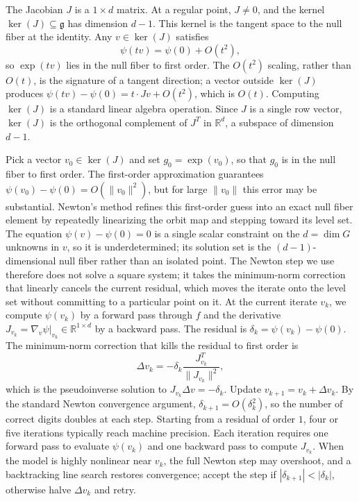 \documentclass[11pt]{article}
\newcommand{\RR}{\mathbb{R}}
\begin{document}
The Jacobian $J$ is a $1 \times d$ matrix. At a regular point, $J \neq 0$, and the kernel $\ker(J) \subseteq \mathfrak{g}$ has dimension $d - 1$. This kernel is the tangent space to the null fiber at the identity. Any $v \in \ker(J)$ satisfies
\begin{equation}
    \psi(tv) = \psi(0) + O(t^2),
\end{equation}
so $\exp(tv)$ lies in the null fiber to first order. The $O(t^2)$ scaling, rather than $O(t)$, is the signature of a tangent direction; a vector outside $\ker(J)$ produces $\psi(tv) - \psi(0) = t \cdot Jv + O(t^2)$, which is $O(t)$. Computing $\ker(J)$ is a standard linear algebra operation. Since $J$ is a single row vector, $\ker(J)$ is the orthogonal complement of $J^T$ in $\RR^d$, a subspace of dimension $d - 1$.

Pick a vector $v_0 \in \ker(J)$ and set $g_0 = \exp(v_0)$, so that $g_0$ is in the null fiber to first order. The first-order approximation guarantees $\psi(v_0) - \psi(0) = O(\|v_0\|^2)$, but for large $\|v_0\|$ this error may be substantial. Newton's method refines this first-order guess into an exact null fiber element by repeatedly linearizing the orbit map and stepping toward its level set. The equation $\psi(v)-\psi(0)=0$ is a single scalar constraint on the $d=\dim G$ unknowns in $v$, so it is underdetermined; its solution set is the $(d-1)$-dimensional null fiber rather than an isolated point. The Newton step we use therefore does not solve a square system; it takes the minimum-norm correction that linearly cancels the current residual, which moves the iterate onto the level set without committing to a particular point on it. At the current iterate $v_k$, we compute $\psi(v_k)$ by a forward pass through $f$ and the derivative $J_{v_k} = \nabla_v \psi|_{v_k} \in \RR^{1 \times d}$ by a backward pass. The residual is $\delta_k = \psi(v_k) - \psi(0)$. The minimum-norm correction that kills the residual to first order is
\begin{equation}\label{eq:newton-step}
    \Delta v_k = -\delta_k \frac{J_{v_k}^T}{\|J_{v_k}\|^2},
\end{equation}
which is the pseudoinverse solution to $J_{v_k} \Delta v = -\delta_k$. Update $v_{k+1} = v_k + \Delta v_k$. By the standard Newton convergence argument, $\delta_{k+1} = O(\delta_k^2)$, so the number of correct digits doubles at each step. Starting from a residual of order $1$, four or five iterations typically reach machine precision. Each iteration requires one forward pass to evaluate $\psi(v_k)$ and one backward pass to compute $J_{v_k}$. When the model is highly nonlinear near $v_k$, the full Newton step may overshoot, and a backtracking line search restores convergence; accept the step if $|\delta_{k+1}| < |\delta_k|$, otherwise halve $\Delta v_k$ and retry.
\end{document}
